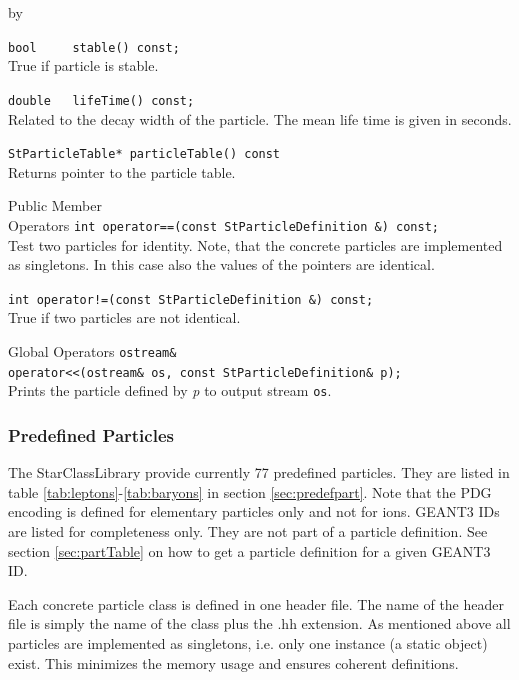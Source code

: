 \documentclass[twoside]{article}
\newcommand{\comp}[1]{\texttt{#1}}%
\newcommand{\args}[1]{\textit{#1}}%
\newcommand{\entrylabel}[1]{\mbox{\textbf{{#1}}}\hfil}%
\newenvironment{entry}
{\begin{list}{}%
    {\renewcommand{\makelabel}{\entrylabel}%
     \setlength{\labelwidth}{90pt}%
     \setlength{\leftmargin}{\labelwidth}
     \advance\leftmargin by \labelsep%
      }%
    }%
  {\end{list}}
\newcommand{\Entrylabel}[1]%
{\raisebox{0pt}[1ex][0pt]{\makebox[\labelwidth][l]%
    {\parbox[t]{\labelwidth}{\hspace{0pt}\textbf{{#1}}}}}}
\newenvironment{Entry}%
{\renewcommand{\entrylabel}{\Entrylabel}\begin{entry}}%
  {\end{entry}}
\begin{document}
\begin{description}
\begin{Entry}
    \verb+bool     stable() const;+\\
    True if particle is stable.
    
    \verb+double   lifeTime() const;+\\ 
    Related to the decay width of the particle.
    The mean life time is given in seconds.
    
    \verb+StParticleTable* particleTable() const+\\ 
    Returns pointer to the particle table.
    
\item[Public Member\\ Operators]
    \verb+int operator==(const StParticleDefinition &) const;+\\
    Test two particles for identity.
    Note, that the concrete particles are implemented as singletons.
    In this case also the values of the pointers are identical.
    
    \verb+int operator!=(const StParticleDefinition &) const;+\\ 
    True if two particles are not identical.
    
\item[Global Operators]
    \verb+ostream& +\\
    \verb+operator<<(ostream& os, const StParticleDefinition& p);+\\ 
    Prints the particle defined by \args{p} to output
    stream \comp{os}.
\end{Entry}

\subsubsection{Predefined Particles}

The StarClassLibrary provide currently 77 predefined particles. They are listed in
table \ref{tab:leptons}-\ref{tab:baryons} in section \ref{sec:predefpart}.
Note that the PDG encoding is  defined for elementary particles only
and not for ions. GEANT3 IDs are listed for completeness only. They are not
part of a particle definition. See section \ref{sec:partTable} on how to
get a particle definition for a given GEANT3 ID.

Each concrete
particle class is defined in one header file. The name of the header file is simply
the name of the class plus the .hh extension.
As mentioned above all particles are implemented as singletons, i.e. only one instance
(a static object) exist. This minimizes the memory usage and ensures coherent definitions.


\end{description}
\end{document}
